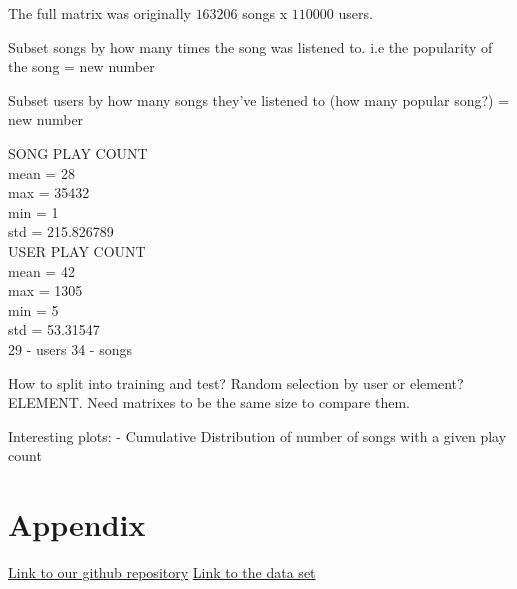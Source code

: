 \documentclass[12pt,preprint]{aastex}
\begin{document}
The full matrix was originally $163206$ songs x $110000$ users. 

Subset songs by how many times the song was listened to. i.e the popularity of the song
= new number 

Subset users by how many songs they've listened to (how many popular song?)
= new number 

SONG PLAY COUNT  \\
mean = 28 \\
max = 35432 \\
min = 1 \\
std = 215.826789\\

USER PLAY COUNT\\
mean = 42\\
max = 1305\\
min = 5\\
std = 53.31547\\

29 - users
34 - songs 

How to split into training and test? 
Random selection by user or element? ELEMENT. 
Need matrixes to be the same size to compare them.

Interesting plots:
- Cumulative Distribution of number of songs with a given play count


\section{Appendix}
\href{https://github.com/eringrand/musicanalysis}{Link to our github repository} 
\href{http://www.dtic.upf.edu/~ocelma/MusicRecommendationDataset/}{Link to the data set}
\end{document}
